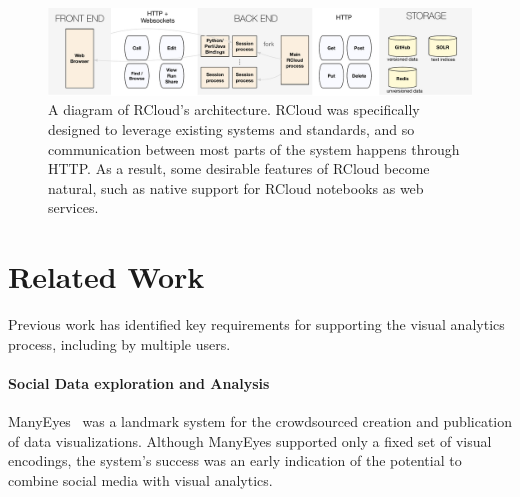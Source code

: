 \begin{figure}
\centering
\includegraphics[width=.9\linewidth]{fig/system/system.pdf}
\caption{\label{fig:system}A diagram of RCloud's architecture. RCloud was specifically designed to leverage existing systems and standards, and so communication between most parts of the system happens through HTTP. As a result, some desirable features of RCloud become natural, such as native support for RCloud notebooks as web services. }
\end{figure}

\section{Related Work\label{sec:related}}

Previous work has identified key requirements for supporting the
visual analytics process, including by multiple users.

\paragraph*{Social Data exploration and Analysis}
ManyEyes~\cite{Viegas:2007:MAS} was a landmark system for the
crowdsourced creation and publication of data visualizations.
Although ManyEyes supported only a fixed set of visual encodings,
the system's success was an early indication of the potential to
combine social media with visual analytics.

